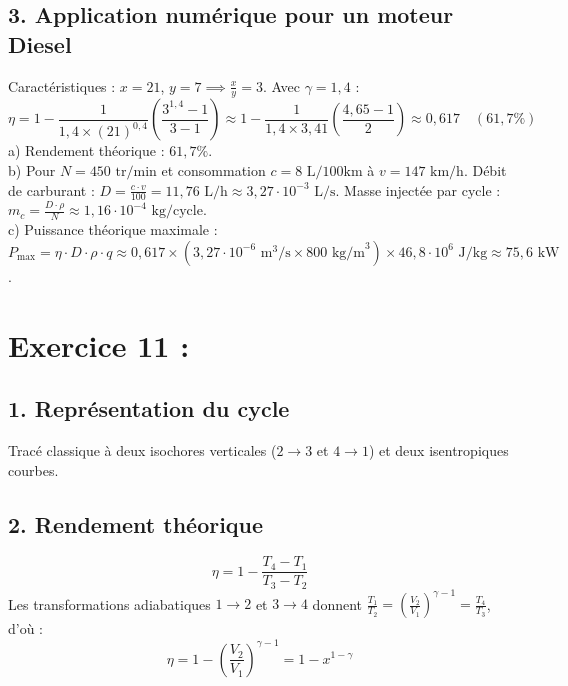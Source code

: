 \documentclass[a4paper,12pt]{article}
\begin{document}
 	\subsection*{3. Application numérique pour un moteur Diesel}
 	Caractéristiques : $x = 21$, $y = 7 \implies \frac{x}{y} = 3$. Avec $\gamma = 1,4$ :
 	\[ \eta = 1 - \frac{1}{1,4 \times (21)^{0,4}} \left( \frac{3^{1,4} - 1}{3 - 1} \right) \approx 1 - \frac{1}{1,4 \times 3,41} \left( \frac{4,65 - 1}{2} \right) \approx 0,617 \quad (61,7\%) \]
 	a) Rendement théorique : $61,7\%$.\\
 	b) Pour $N = 450\text{ tr/min}$ et consommation $c = 8\text{ L/100km}$ à $v = 147\text{ km/h}$.
 	Débit de carburant : $D = \frac{c \cdot v}{100} = 11,76\text{ L/h} \approx 3,27\cdot 10^{-3}\text{ L/s}$.
 	Masse injectée par cycle : $m_c = \frac{D \cdot \rho}{N} \approx 1,16\cdot 10^{-4}\text{ kg/cycle}$.\\
 	c) Puissance théorique maximale : $P_{\text{max}} = \eta \cdot D \cdot \rho \cdot q \approx 0,617 \times (3,27\cdot 10^{-6}\text{ m}^3\text{/s} \times 800\text{ kg/m}^3) \times 46,8\cdot 10^6\text{ J/kg} \approx 75,6\text{ kW}$.
 	
 	\newpage
 	
 	\section*{Exercice 11 : }
 	\subsection*{1. Représentation du cycle}
 	Tracé classique à deux isochores verticales ($2\rightarrow3$ et $4\rightarrow1$) et deux isentropiques courbes.
 	
 	\subsection*{2. Rendement théorique}
 	\[ \eta = 1 - \frac{T_4 - T_1}{T_3 - T_2} \]
 	Les transformations adiabatiques $1\rightarrow2$ et $3\rightarrow4$ donnent $\frac{T_1}{T_2} = \left(\frac{V_2}{V_1}\right)^{\gamma-1} = \frac{T_4}{T_3}$, d'où :
 	\[ \eta = 1 - \left(\frac{V_2}{V_1}\right)^{\gamma-1} = 1 - x^{1-\gamma} \]
 	
\end{document}
